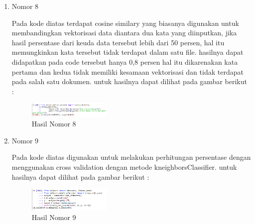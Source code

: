 \begin{enumerate}
\item Nomor 8
\hfill\break
	
Pada kode diatas terdapat cosine similary yang biasanya digunakan untuk membandingkan vektorisasi data diantara dua kata yang diinputkan, jika hasil persentase dari keuda data tersebut lebih dari 50 persen, hal itu memungkinkan kata tersebut tidak terdapat dalam satu file. hasilnya dapat didapatkan pada code tersebut hanya 0,8 persen hal itu dikarenakan kata pertama dan kedua tidak memiliki kesamaan vektorisasi dan tidak terdapat pada salah satu dokumen. untuk hasilnya dapat dilihat pada gambar berikut :
\hfill\break
	\begin{figure}[H]
		\includegraphics[width=4cm]{figures/1174054/5/32.png}
		\centering
		\caption{Hasil Nomor 8}
	\end{figure}
	
\item Nomor 9
\hfill\break
	
Pada kode diatas digunakan untuk melakukan perhitungan persentase dengan menggunakan cross validation dengan metode kneighborsClassifier. untuk hasilnya dapat dilihat pada gambar berikut :
\hfill\break
	\begin{figure}[H]
		\includegraphics[width=4cm]{figures/1174054/5/33.png}
		\centering
		\caption{Hasil Nomor 9}
	\end{figure}
\end{enumerate}

